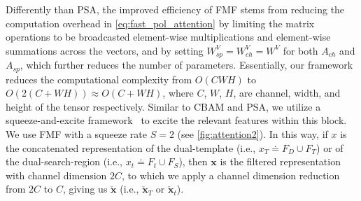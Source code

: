 Differently than PSA, the improved efficiency of FMF stems from reducing the computation overhead in \ref{eq:fast_pol_attention} by limiting the matrix operations to be broadcasted element-wise multiplications and element-wise summations across the vectors, and by setting $W^V_{sp}=W^V_{ch}=W^V$ for both $A_{ch}$ and $A_{sp}$, which further reduces the number of parameters. Essentially, our framework reduces the computational complexity from $O(CWH)$ to $O(2(C+WH)) \approx O(C+WH)$, where $C$, $W$, $H$, are channel, width, and height of the tensor respectively. Similar to CBAM and PSA, we utilize a squeeze-and-excite framework~\cite{iandola2016squeezenet} to excite the relevant features within this block. We use FMF with a squeeze rate $S=2$ (see \ref{fig:attention2}). In this way, if $x$ is the concatenated representation of the dual-template (i.e., $x_T \doteq F_D \cup F_T$) or of the dual-search-region (i.e., $x_t \doteq F_t \cup F_S$), then $\boldsymbol{x}$ is the filtered representation with channel dimension $2C$, to which we apply a channel dimension reduction from $2C$ to $C$, giving us $\boldsymbol{\check{x}}$ (i.e., $\boldsymbol{\check{x}}_T$ or $\boldsymbol{\check{x}}_t$). \\

